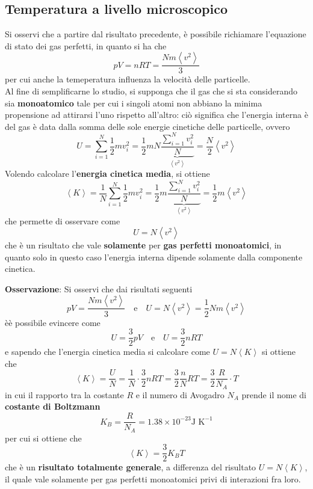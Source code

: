 \documentclass[a4paper]{extarticle}
\begin{document}
\vspace{1em}
\subsection{Temperatura a livello microscopico}
Si osservi che a partire dal risultato precedente, è possibile richiamare l'equazione di stato dei gas perfetti, in quanto si ha che
\[pV = n R T = \frac{N m \left< v^2 \right>}{3}\]
per cui anche la temeperatura influenza la velocità delle particelle.\\
Al fine di semplificarne lo studio, si supponga che il gas che si sta considerando sia \textbf{monoatomico} tale per cui i singoli atomi non abbiano la minima propensione ad attirarsi l'uno rispetto all'altro: ciò significa che l'energia interna è del gas è data dalla somma delle sole energie cinetiche delle particelle, ovvero
\[U = \sum_{i=1}^N \frac{1}{2} m v_i^2 = \frac{1}{2} m N \underbrace{\frac{\displaystyle{\sum_{i=1}^N v_i^2}}{N}}_{\left< v^2 \right>} = \frac{N}{2} \left< v^2 \right>\]
Volendo calcolare l'\textbf{energia cinetica media}, si ottiene
\[\left<K\right>=\frac{1}{N} \sum_{i=1}^N \frac{1}{2} m v_i^2 = \frac{1}{2} m \underbrace{\frac{\displaystyle{\sum_{i=1}^N v_i^2}}{N}}_{\left< v^2 \right>} = \frac{1}{2} m \left< v^2 \right>\]
che permette di osservare come
\[\boxed{U=N \left< v^2 \right>}\]
che è un risultato che vale \textbf{solamente} per \textbf{gas perfetti monoatomici}, in quanto solo in questo caso l'energia interna dipende solamente dalla componente cinetica.

\vspace{1em}
\noindent
\textbf{Osservazione}: Si osservi che dai risultati seguenti
\[\boxed{pV = \frac{N m \left< v^2 \right>}{3}} \hspace{1em} \text{e} \hspace{1em} \boxed{U=N \left< v^2 \right> = \frac{1}{2} N m \left<v^2\right>}\]
èè possibile evincere come
\[\boxed{U=\frac{3}{2} p V} \hspace{1em} \text{e} \hspace{1em} \boxed{U=\frac{3}{2} n R T}\]
e sapendo che l'energia cinetica media si calcolare come $U = N \left< K \right>$ si ottiene che
\[\left<K\right> = \frac{U}{N} = \frac{1}{N} \cdot \frac{3}{2} n R T = \frac{3}{2} \frac{n}{N} R T = \frac{3}{2} \frac{R}{N_A} \cdot T\]
in cui il rapporto tra la costante $R$ e il numero di Avogadro $N_A$ prende il nome di \textbf{costante di Boltzmann}
\[\boxed{K_B = \frac{R}{N_A} = 1.38 \times 10^{-23} \text{J K}^{-1}}\]
per cui si ottiene che
\[\boxed{\left<K\right> = \frac{3}{2} K_B T}\]
che è un \textbf{risultato totalmente generale}, a differenza del risultato $U = N \left<K\right>$, il quale vale solamente per gas perfetti monoatomici privi di interazioni fra loro.
\end{document}
